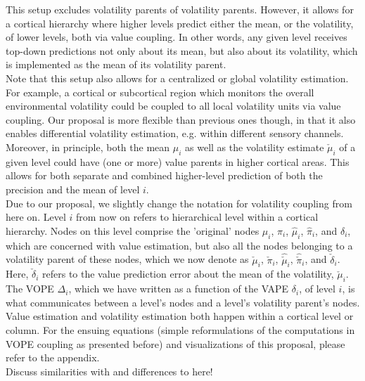 This setup excludes volatility parents of volatility parents. However, it allows for a cortical hierarchy where higher levels predict either the mean, or the volatility, of lower levels, both via value coupling. In other words, any given level receives top-down predictions not only about its mean, but also about its volatility, which is implemented as the mean of its volatility parent.\\

Note that this setup also allows for a centralized or global volatility estimation. For example, a cortical or subcortical region which monitors the overall environmental volatility could be coupled to all local volatility units via value coupling. Our proposal is more flexible than previous ones \cite{Kanai2015} though, in that it also enables differential volatility estimation, e.g. within different sensory channels. \\

Moreover, in principle, both the mean $\mu_i$ as well as the volatility estimate $\check{\mu}_i$ of a given level could have (one or more) value parents in higher cortical areas. This allows for both separate and combined higher-level prediction of both the precision and the mean of level $i$.\\

Due to our proposal, we slightly change the notation for volatility coupling from here on. Level $i$ from now on refers to hierarchical level within a cortical hierarchy. Nodes on this level comprise the 'original' nodes $\mu_i$, $\pi_i$, $\hat{\mu}_i$, $\hat{\pi}_i$, and $\delta_i$, which are concerned with value estimation, but also all the nodes belonging to a volatility parent of these nodes, which we now denote as $\check{\mu}_i$, $\check{\pi}_i$, $\hat{\check{\mu}}_i$, $\hat{\check{\pi}}_i$, and $\check{\delta}_i$. Here, $\check{\delta}_i$ refers to the value prediction error about the mean of the volatility, $\check{\mu}_i$. \\

The \textsf{VOPE} $\Delta_i$, which we have written as a function of the \textsf{VAPE} $\delta_i$, of level $i$, is what communicates between a level's nodes and a level's volatility parent's nodes. Value estimation and volatility estimation both happen within a cortical level or column. For the ensuing equations (simple reformulations of the computations in \textsf{VOPE} coupling as presented before) and visualizations of this proposal, please refer to the appendix. \\

Discuss similarities with and differences to \cite{Kanai2015} here!\\

